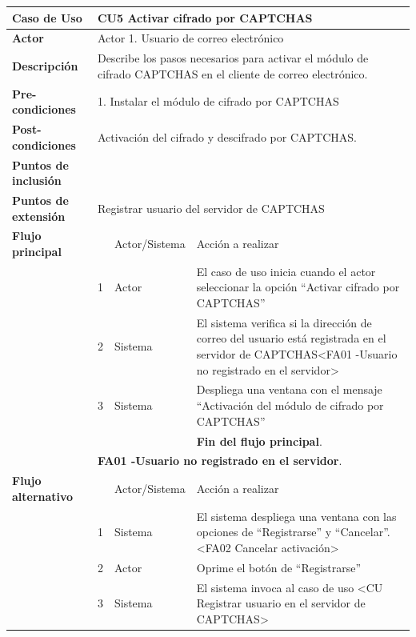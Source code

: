 \documentclass[12pt,oneside,onecolumn,openany]{report}
\begin{document}
\begin{longtable}[H]{| p{} | p{} |p{4cm}|p{5cm}|}
     \hline
     \textbf{Caso de Uso} &\multicolumn{3}{|l|}{CU5 Activar cifrado por CAPTCHAS}\\
     \hline
     \textbf{Actor} & \multicolumn{3}{|l|}{Actor 1. Usuario de correo electrónico}\\
     \hline
     \textbf{Descripción} & \multicolumn{3}{|p{10cm}|}{Describe los pasos necesarios para activar el módulo de cifrado CAPTCHAS en el cliente de correo electrónico.}\\
     \hline
     \textbf{Pre-condiciones} & \multicolumn{3}{|l|}{1. Instalar el módulo de cifrado por CAPTCHAS}\\
     \hline
     \textbf{Post-condiciones} & \multicolumn{3}{|l|}{Activación del cifrado y descifrado por CAPTCHAS.}\\
     \hline
     \textbf{Puntos de inclusión} & \multicolumn{3}{|l|}{}\\
     \hline
     \textbf{Puntos de extensión} & \multicolumn{3}{|l|}{Registrar usuario del servidor de CAPTCHAS}\\
     \hline
     \textbf{Flujo principal} & & Actor/Sistema & Acción a realizar\\
     \hline
     & 1 & Actor & El caso de uso inicia cuando el actor seleccionar la opción ``Activar cifrado por CAPTCHAS''\\
     \hline
     & 2 & Sistema & El sistema verifica si la dirección de correo del usuario está registrada en el servidor de CAPTCHAS<FA01 -Usuario no registrado en el servidor>\\
     \hline
     & 3 & Sistema & Despliega una ventana con el mensaje ``Activación del módulo de cifrado por CAPTCHAS''\\
     \hline
     & & & \textbf{Fin del flujo principal}.\\
     \hline
     & \multicolumn{3}{|l|}{\textbf{FA01 -Usuario no registrado en el servidor}.}\\
     \hline
     \textbf{Flujo alternativo} & & Actor/Sistema & Acción a realizar\\
     \hline
     & 1 & Sistema & El sistema despliega una ventana con las opciones de ``Registrarse'' y ``Cancelar''. <FA02 Cancelar activación>\\
     \hline
     & 2 & Actor & Oprime el botón de ``Registrarse''\\
     \hline
     & 3 & Sistema & El sistema invoca al caso de uso <CU Registrar usuario en el servidor de CAPTCHAS>\\

\end{longtable}
\end{document}
